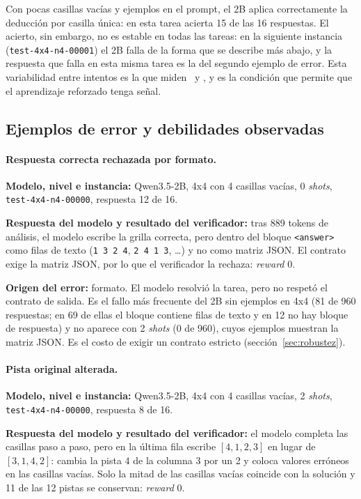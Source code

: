 Con pocas casillas vacías y ejemplos en el prompt, el 2B aplica correctamente la
deducción por casilla única: en esta tarea acierta 15 de las 16 respuestas. El
acierto, sin embargo, no es estable en todas las tareas: en la siguiente instancia
(\texttt{test-4x4-n4-00001}) el 2B falla de la forma que se describe más abajo, y
la respuesta que falla en esta misma tarea es la del segundo ejemplo de error. Esta
variabilidad entre intentos es la que miden \passuno\ y \passk, y es la condición
que permite que el aprendizaje reforzado tenga señal.

\subsection{Ejemplos de error y debilidades observadas}

\paragraph{Respuesta correcta rechazada por formato.}
\textbf{Modelo, nivel e instancia:} Qwen3.5-2B, 4x4 con 4 casillas vacías, 0
\emph{shots}, \texttt{test-4x4-n4-00000}, respuesta 12 de 16.

\textbf{Respuesta del modelo y resultado del verificador:} tras 889 tokens de
análisis, el modelo escribe la grilla correcta, pero dentro del bloque
\texttt{<answer>} como filas de texto (\texttt{1 3 2 4}, \texttt{2 4 1 3}, \ldots)
y no como matriz JSON. El contrato exige la matriz JSON, por lo que el verificador
la rechaza: \emph{reward} 0.

\textbf{Origen del error:} formato. El modelo resolvió la tarea, pero no respetó
el contrato de salida. Es el fallo más frecuente del 2B sin ejemplos en 4x4 (81
de 960 respuestas; en 69 de ellas el bloque contiene filas de texto y en 12 no
hay bloque de respuesta) y no aparece con 2 \emph{shots} (0 de 960), cuyos
ejemplos muestran la matriz JSON. Es el costo de exigir un contrato estricto
(sección~\ref{sec:robustez}).

\paragraph{Pista original alterada.}
\textbf{Modelo, nivel e instancia:} Qwen3.5-2B, 4x4 con 4 casillas vacías, 2
\emph{shots}, \texttt{test-4x4-n4-00000}, respuesta 8 de 16.

\textbf{Respuesta del modelo y resultado del verificador:} el modelo completa
las casillas paso a paso, pero en la última fila escribe $[4,1,2,3]$ en lugar
de $[3,1,4,2]$: cambia la pista 4 de la columna 3 por un 2 y coloca valores
erróneos en las casillas vacías. Solo la mitad de las casillas vacías coincide con la solución y 11 de
las 12 pistas se conservan: \emph{reward} 0.

